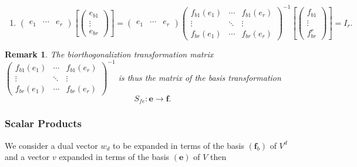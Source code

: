\documentclass[aps,preprint]{revtex4}
\newtheorem{remark}[theorem]{Remark}
\begin{document}
\begin{enumerate}
\item 
\begin{equation}
\left( 
\begin{array}{ccc}
e_{1} & \cdots & e_{r}%
\end{array}%
\right) \left[ \left( 
\begin{array}{c}
e_{b1} \\ 
\vdots \\ 
e_{br}%
\end{array}%
\right) \right] =\left( 
\begin{array}{ccc}
e_{1} & \cdots & e_{r}%
\end{array}%
\right) \left( 
\begin{array}{ccc}
f_{b1}\left( e_{1}\right) & \cdots & f_{b1}\left( e_{r}\right) \\ 
\vdots & \ddots & \vdots \\ 
f_{br}\left( e_{1}\right) & \cdots & f_{br}\left( e_{r}\right)%
\end{array}%
\right) ^{-1}\left[ \left( 
\begin{array}{c}
f_{b1} \\ 
\vdots \\ 
f_{br}^{r}%
\end{array}%
\right) \right] =I_{r}.
\end{equation}
\end{enumerate}

\begin{remark}
The biorthogonaliztion transformation matrix $\left( 
\begin{array}{ccc}
f_{b1}\left( e_{1}\right) & \cdots & f_{b1}\left( e_{r}\right) \\ 
\vdots & \ddots & \vdots \\ 
f_{br}\left( e_{1}\right) & \cdots & f_{br}\left( e_{r}\right)%
\end{array}%
\right) ^{-1}$ is thus the matrix of the basis transformation 
\begin{equation}
S_{fe}:\boldsymbol{e}\rightarrow \boldsymbol{f.}
\end{equation}
\end{remark}

\subsubsection{Scalar Products}

We consider a dual vector $w_{d}$ to be expanded in terms of the basis $%
\left( \boldsymbol{f}_{b}\right) $ of $V^{d}$ and a vector $v$ expanded in
terms of the basis $\left( \boldsymbol{e}\right) $ of $V$ then
\end{document}
